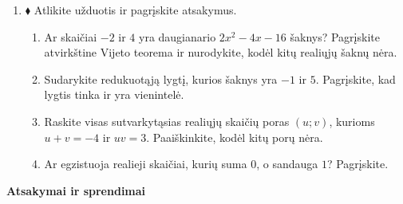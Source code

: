 \documentclass[12pt,a4paper]{article}
\begin{document}
\begin{enumerate}[resume=uzdaviniai]
\item $\blacklozenge$ Atlikite užduotis ir pagrįskite atsakymus.
\begin{enumerate}
\item Ar skaičiai $-2$ ir $4$ yra daugianario $2x^2-4x-16$ šaknys? Pagrįskite atvirkštine Vijeto teorema ir nurodykite, kodėl kitų realiųjų šaknų nėra.
\item Sudarykite redukuotąją lygtį, kurios šaknys yra $-1$ ir $5$. Pagrįskite, kad lygtis tinka ir yra vienintelė.
\item Raskite visas sutvarkytąsias realiųjų skaičių poras $(u;v)$, kurioms $u+v=-4$ ir $uv=3$. Paaiškinkite, kodėl kitų porų nėra.
\item Ar egzistuoja realieji skaičiai, kurių suma $0$, o sandauga $1$? Pagrįskite.
\end{enumerate}
\end{enumerate}
\newpage
\begin{center}{\Large\bfseries Atsakymai ir sprendimai}\end{center}
\end{document}
